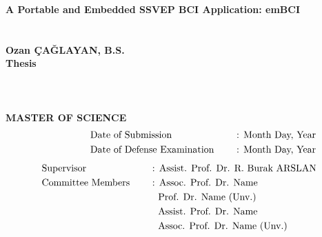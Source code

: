 \clearpage
\setcounter{page}{1}
\thispagestyle{empty}
{
\vspace*{-7.5mm}
\centering\textbf{A Portable and Embedded SSVEP BCI Application: emBCI}\\\vspace*{1.5mm}
\\\vspace*{1.5mm}
\vspace*{13mm}
\\\vspace*{1.5mm}
\centering\textbf{Ozan ÇAĞLAYAN, B.S.}\\
\vspace*{30pt}
\centering\textbf{Thesis}\\\vspace*{1.5mm}
\\\vspace*{1.5mm}
\\\vspace*{1.5mm}
\\
\vspace*{30pt}
\centering\textbf{MASTER OF SCIENCE}\\
\vspace*{10pt}
\begin{alignat*}{2}
 & \quad\quad\quad\quad\quad\text{Date of Submission \quad } && \text{: Month Day, Year} \\
 & \quad\quad\quad\quad\quad\text{Date of Defense Examination \quad } && \text{: Month Day, Year}
\end{alignat*}
\vspace*{10pt}
\begin{alignat*}{2}
 & \text{Supervisor} && \text{: Assist. Prof. Dr. R. Burak ARSLAN} \\
 & \text{Committee Members \quad } && \text{: Assoc. Prof. Dr. Name} \\
 & \text{} && \text{\; Prof. Dr. Name (Unv.)} \\
 & \text{} && \text{\; Assist. Prof. Dr. Name} \\
 & \text{} && \text{\; Assoc. Prof. Dr. Name (Unv.)}
\end{alignat*}
}